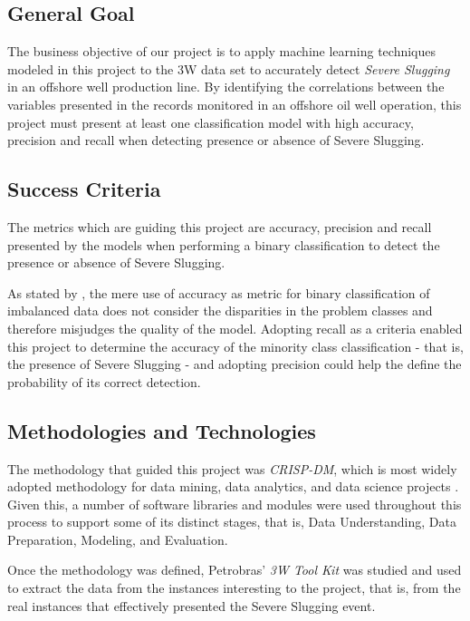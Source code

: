 \documentclass{article}
\begin{document}
\subsection{General Goal}
The business objective of our project is to apply machine learning techniques modeled in this project to the 3W data set to accurately detect \emph{Severe Slugging} in an offshore well production line. By identifying the correlations between the variables presented in the records monitored in an offshore oil well operation, this project must present at least one classification model with high accuracy, precision and recall when detecting presence or absence of Severe Slugging. 

\subsection{Success Criteria}
The metrics which are guiding this project are accuracy, precision and recall presented by the models when performing a binary classification to detect the presence or absence of Severe Slugging. 

As stated by \textcite{wegier_ksieniewicz_2020}, the mere use of accuracy as metric for binary classification of imbalanced data does not consider the disparities in the problem classes and therefore misjudges the quality of the model. Adopting recall as a criteria enabled this project to determine the accuracy of the minority class classification - that is, the presence of Severe Slugging - and adopting precision could help the define the  probability of its correct detection.

\subsection{Methodologies and Technologies}
\label{sec:methodtech}
The methodology that guided this project was \emph{CRISP-DM}, which is most widely adopted methodology for data mining, data analytics, and data science projects \parencite{ibm_crisp_dm}. Given this, a number of software libraries and modules were used throughout this process to support some of its distinct stages, that is, Data Understanding, Data Preparation, Modeling, and Evaluation. 

Once the methodology was defined, Petrobras' \emph{3W Tool Kit} was studied and used to extract the data from the instances interesting to the project, that is, from the real instances that effectively presented the Severe Slugging event.
\end{document}
